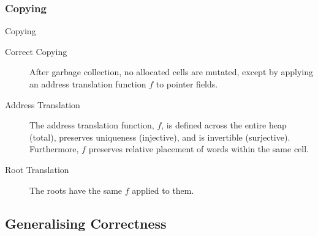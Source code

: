 \documentclass[usenames,dvipsnames]{beamer}
\begin{document}
\subsubsection{Copying}

\begin{frame}{Copying}
  \begin{description}
  \item[Correct Copying] After garbage collection, no allocated cells
    are mutated, except by applying an address translation function
    $f$ to pointer fields.

  \item[Address Translation] The address translation function, $f$, is
    defined across the entire heap (total), preserves uniqueness
    (injective), and is invertible (surjective). Furthermore, $f$
    preserves relative placement of words within the same cell.

  \item[Root Translation] The roots have the same $f$ applied to them.
  \end{description}

\end{frame}

\subsection{Generalising Correctness}
\end{document}
